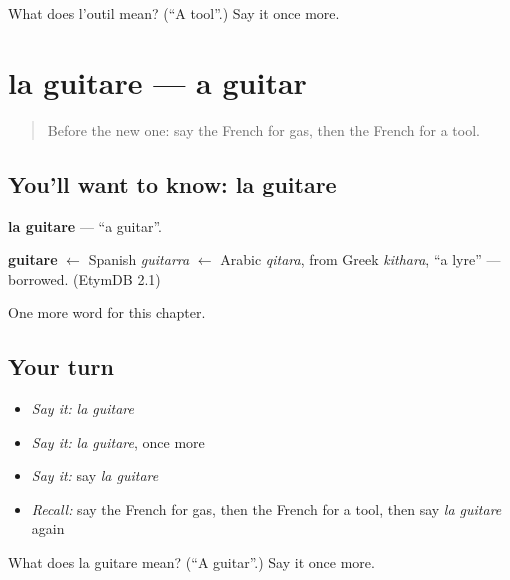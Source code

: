 \begin{tcolorbox}[breakable,colback=teal!4,colframe=teal!35!black,title={Before you move on}]
What does l'outil mean? (\textquotedblleft{}A tool\textquotedblright{}.) Say it once more.
\end{tcolorbox}
\section[la guitare]{la guitare — a guitar}

\label{lesson:FR-C256-guitare}



\begin{quote}
Before the new one: say the French for gas, then the French for a tool.
\end{quote}

\subsection*{You'll want to know: la guitare}
\textbf{la guitare} — \textquotedblleft{}a guitar\textquotedblright{}.

\begin{cousinweb}
\textbf{guitare} $\leftarrow$ Spanish \emph{guitarra} $\leftarrow$ Arabic \emph{qitara}, from Greek \emph{kithara}, \textquotedblleft{}a lyre\textquotedblright{} — borrowed. (EtymDB 2.1)
\end{cousinweb}

\begin{grammarlens}[title={What you've built}]
One more word for this chapter.
\end{grammarlens}

\subsection*{Your turn}
\begin{itemize}
\raggedright
  \item \emph{Say it:} \emph{la guitare}
  \item \emph{Say it:} \emph{la guitare}, once more
  \item \emph{Say it:} say \emph{la guitare}
  \item \emph{Recall:} say the French for gas, then the French for a tool, then say \emph{la guitare} again
\end{itemize}

\begin{tcolorbox}[breakable,colback=teal!4,colframe=teal!35!black,title={Before you move on}]
What does la guitare mean? (\textquotedblleft{}A guitar\textquotedblright{}.) Say it once more.
\end{tcolorbox}
